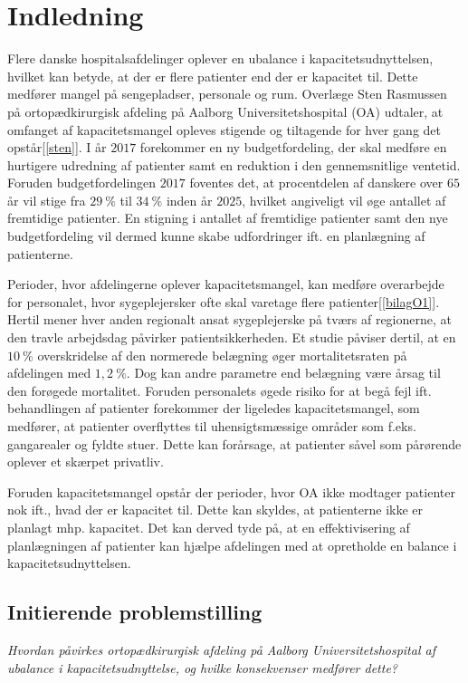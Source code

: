 \chapter{Indledning} \label{indl}
Flere danske hospitalsafdelinger oplever en ubalance i kapacitetsudnyttelsen, hvilket kan betyde, at der er flere patienter end der er kapacitet til. Dette medfører mangel på sengepladser, personale og rum.\cite{Company2013} Overlæge Sten Rasmussen på ortopædkirurgisk afdeling på Aalborg Universitetshospital (OA) udtaler, at omfanget af kapacitetsmangel opleves stigende og tiltagende for hver gang det opstår[\ref{sten}]. I år $2017$ forekommer en ny budgetfordeling, der skal medføre en hurtigere udredning af patienter samt en reduktion i den gennemsnitlige ventetid\cite{Budget2016}. 
Foruden budgetfordelingen $2017$ foventes det, at procentdelen af danskere over $65$ år vil stige fra $29~\%$ til $34~\%$ inden år $2025$, hvilket angiveligt vil øge antallet af fremtidige patienter. En stigning i antallet af fremtidige patienter samt den nye budgetfordeling vil dermed kunne skabe udfordringer ift. en planlægning af patienterne.

Perioder, hvor afdelingerne oplever kapacitetsmangel, kan medføre overarbejde for personalet, hvor sygeplejersker ofte skal varetage flere patienter\cite{Danske2015}[\ref{bilagO1}]. Hertil mener hver anden regionalt ansat sygeplejerske på tværs af regionerne, at den travle arbejdsdag påvirker patientsikkerheden\cite{Kjeldsen2015}. Et studie påviser dertil, at en $10~\%$ overskridelse af den normerede belægning øger mortalitetsraten på afdelingen med $1,2~\%$. Dog kan andre parametre end belægning være årsag til den forøgede mortalitet. Foruden personalets øgede risiko for at begå fejl ift. behandlingen af patienter forekommer der ligeledes kapacitetsmangel, som medfører, at patienter overflyttes til uhensigtsmæssige områder som f.eks. gangarealer og fyldte stuer\cite{Madsen2014}. Dette kan forårsage, at patienter såvel som pårørende oplever et skærpet privatliv\cite{Heidmann2014}.

Foruden kapacitetsmangel opstår der perioder, hvor OA ikke modtager patienter nok ift., hvad der er kapacitet til. Dette kan skyldes, at patienterne ikke er planlagt mhp. kapacitet. Det kan derved tyde på, at en effektivisering af planlægningen af patienter kan hjælpe afdelingen med at opretholde en balance i kapacitetsudnyttelsen. 

\section{Initierende problemstilling}
\textit{Hvordan påvirkes ortopædkirurgisk afdeling på Aalborg Universitetshospital af ubalance i kapacitetsudnyttelse, og hvilke konsekvenser medfører dette?}




